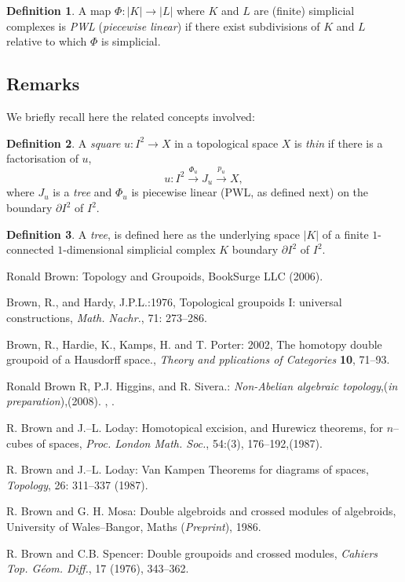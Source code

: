 \documentclass[12pt]{article}
\theoremstyle{plain}
\theoremstyle{definition}
\newtheorem{definition}{Definition}[section]
\numberwithin{equation}{section}
\begin{document}
\begin{definition}
A map $ \Phi : |K| \longrightarrow |L| $ where $ K $ and $ L $ are
(finite) simplicial complexes is \emph{PWL} ({\it piecewise linear}) if
there exist subdivisions of $ K $ and $ L $ relative to which $ \Phi$ is simplicial.
\end{definition}

\subsection{Remarks}

We briefly recall here the related concepts involved:
\begin{definition}
A \emph{square} $ u:I^{2} \longrightarrow X $ in a topological space $ X $ is \emph{thin} if there
is a factorisation of $ u $, $$ u : I^{2} \stackrel{\Phi_{u}}{\longrightarrow}
J_{u} \stackrel{p_{u}}{\longrightarrow} X, $$ where $J_{u}$ is a
\emph{tree} and $ \Phi_{u} $ is piecewise linear (PWL, as defined next) on the
boundary $ \partial{I}^{2} $ of $ I^{2} $.
\end{definition}

\begin{definition}
A {\it tree}, is defined here as the underlying space $ |K| $ of a
finite $ 1 $-connected $ 1 $-dimensional simplicial complex $ K $ boundary
$ \partial{I}^{2} $ of $ I^{2} $.
\end{definition}

\begin{thebibliography}{99}
Ronald Brown: Topology and Groupoids, BookSurge LLC (2006).

Brown, R., and Hardy, J.P.L.:1976, Topological groupoids I:
universal constructions, \emph{Math. Nachr.}, 71: 273--286.

Brown, R., Hardie, K., Kamps, H. and T. Porter: 2002, The homotopy
double groupoid of a Hausdorff space.,
\emph{Theory and pplications of Categories} \textbf{10}, 71--93.

Ronald Brown R, P.J. Higgins, and R. Sivera.: {\em Non-Abelian algebraic topology},({\em in preparation}),(2008).
, .

R. Brown and J.--L. Loday: Homotopical excision, and Hurewicz theorems, for $n$--cubes of spaces,
\emph{Proc. London Math. Soc.}, 54:(3), 176--192,(1987).

R. Brown and J.--L. Loday: Van Kampen Theorems for diagrams of spaces, \emph{Topology}, 26: 311--337 (1987).

R. Brown and G. H. Mosa: Double algebroids and crossed modules of algebroids, University of Wales--Bangor, Maths
({\em Preprint}), 1986.

R. Brown and C.B. Spencer: Double groupoids and crossed modules, {\em Cahiers Top. G\'eom. Diff.}, 17 (1976), 343--362.

\end{thebibliography}

\end{document}
